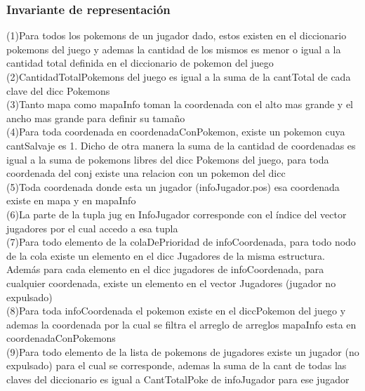 \begin{Representacion}
\subsubsection{Invariante de representación}


(1)Para todos los pokemons de un jugador dado, estos existen en el diccionario pokemons del juego y ademas la cantidad de los mismos es menor o igual a la cantidad total definida en el diccionario de pokemon del juego\\

(2)CantidadTotalPokemons del juego es igual a la suma de la cantTotal de cada clave del dicc Pokemons\\

(3)Tanto mapa como mapaInfo toman la coordenada con el alto mas grande y el ancho mas grande para definir su tamaño\\

(4)Para toda coordenada en coordenadaConPokemon, existe un pokemon cuya cantSalvaje es 1. Dicho de otra manera la suma de la cantidad de coordenadas es igual a la suma de pokemons libres del dicc Pokemons del juego, para toda coordenada del conj existe una relacion con un pokemon del dicc\\

(5)Toda coordenada donde esta un jugador (infoJugador.pos) esa coordenada existe en mapa y en mapaInfo\\

(6)La parte de la tupla jug en InfoJugador corresponde con el índice del vector jugadores por el cual accedo a esa tupla\\

(7)Para todo elemento de la colaDePrioridad de infoCoordenada, para todo nodo de la cola existe un elemento en el dicc Jugadores de la misma estructura. Además para cada elemento en el dicc jugadores de infoCoordenada, para cualquier coordenada, existe un elemento en el vector Jugadores (jugador no expulsado)\\

(8)Para toda infoCoordenada el pokemon existe en el diccPokemon del juego y ademas la coordenada por la cual se filtra el arreglo de arreglos mapaInfo esta en coordenadaConPokemons \\

(9)Para todo elemento de la lista de pokemons de jugadores existe un jugador (no expulsado) para el cual se corresponde, ademas la suma de la cant de todas las claves del diccionario es igual a CantTotalPoke de infoJugador para ese jugador\\


\end{Representacion}
